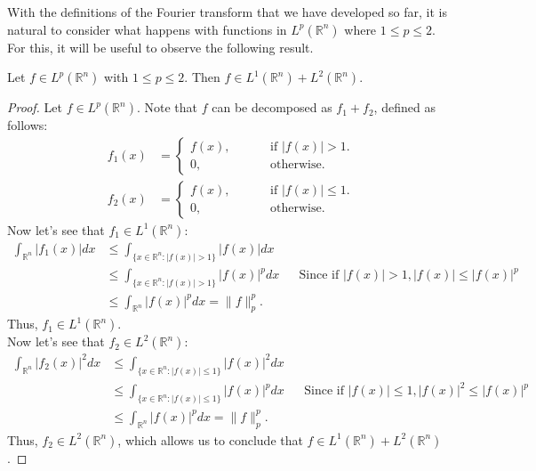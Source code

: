  With the definitions of the Fourier transform that we have developed so far, it is natural to consider what happens with functions in $L^p(\mathbb{R}^n)$ where $1 \leq p \leq 2$. For this, it will be useful to observe the following result.
\begin{proposition}{}
  Let $f \in L^p(\mathbb{R}^n)$ with $1 \leq p \leq 2$. Then $f \in L^1(\mathbb{R}^n) + L^2(\mathbb{R}^n)$.
\end{proposition}
\begin{proof}{}
  Let $f \in L^p(\mathbb{R}^n)$. Note that $f$ can be decomposed as $f_1 + f_2$, defined as follows:
  \begin{align*}
    f_1(x) &= \begin{cases}
      f(x),\hspace{1cm} & \text{if } |f(x)| > 1. \\
      0,\hspace{1cm} & \text{otherwise.}
    \end{cases} \\
    f_2(x) &= \begin{cases}
      f(x),\hspace{1cm} & \text{if } |f(x)| \leq 1. \\
      0,\hspace{1cm} & \text{otherwise.}
    \end{cases}
  \end{align*}
  Now let's see that $f_1 \in L^1(\mathbb{R}^n)$:
  \begin{align*}
    \int_{\mathbb{R}^n}|f_1(x)|dx &\leq \int_{\{x \in \mathbb{R}^n: |f(x)| > 1\}} |f(x)| dx \\
    &\leq \int_{\{x \in \mathbb{R}^n: |f(x)| > 1\}} |f(x)|^p dx && \text{Since if } |f(x)| > 1, |f(x)| \leq |f(x)|^p \\
    &\leq \int_{\mathbb{R}^n} |f(x)|^p dx = \|f\|_p^p.
  \end{align*}
  Thus, $f_1 \in L^{1}(\mathbb{R}^n)$. \\
  Now let's see that $f_2 \in L^2(\mathbb{R}^n)$:
  \begin{align*}
    \int_{\mathbb{R}^n}|f_2(x)|^2dx &\leq \int_{\{x \in \mathbb{R}^n: |f(x)| \leq 1\}} |f(x)|^2 dx \\
    &\leq \int_{\{x \in \mathbb{R}^n: |f(x)| \leq 1\}} |f(x)|^p dx && \text{Since if } |f(x)| \leq 1, |f(x)|^2 \leq |f(x)|^p \\
    &\leq \int_{\mathbb{R}^n} |f(x)|^p dx = \|f\|_p^p.
  \end{align*}
  Thus, $f_2 \in L^2(\mathbb{R}^n)$, which allows us to conclude that $f \in L^1(\mathbb{R}^n) + L^2(\mathbb{R}^n)$.
\end{proof}
